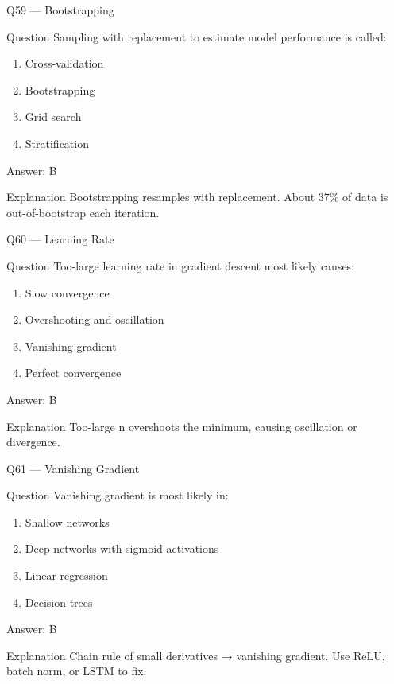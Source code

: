 \documentclass[aspectratio=169,8pt]{beamer}
\begin{document}
	\begin{frame}{Q59 --- Bootstrapping}
		\begin{block}{Question}
			Sampling with replacement to estimate model performance is called:
		\end{block}
		\begin{enumerate}
			\item Cross-validation
			\item Bootstrapping
			\item Grid search
			\item Stratification
		\end{enumerate}
		\begin{exampleblock}{Answer: B}\end{exampleblock}
		\begin{block}{Explanation}
			Bootstrapping resamples with replacement. About 37\% of data is out-of-bootstrap each iteration.
		\end{block}
	\end{frame}
	
	\begin{frame}{Q60 --- Learning Rate}
		\begin{block}{Question}
			Too-large learning rate in gradient descent most likely causes:
		\end{block}
		\begin{enumerate}
			\item Slow convergence
			\item Overshooting and oscillation
			\item Vanishing gradient
			\item Perfect convergence
		\end{enumerate}
		\begin{exampleblock}{Answer: B}\end{exampleblock}
		\begin{block}{Explanation}
			Too-large n overshoots the minimum, causing oscillation or divergence.
		\end{block}
	\end{frame}
	
	\begin{frame}{Q61 --- Vanishing Gradient}
		\begin{block}{Question}
			Vanishing gradient is most likely in:
		\end{block}
		\begin{enumerate}
			\item Shallow networks
			\item Deep networks with sigmoid activations
			\item Linear regression
			\item Decision trees
		\end{enumerate}
		\begin{exampleblock}{Answer: B}\end{exampleblock}
		\begin{block}{Explanation}
			Chain rule of small derivatives → vanishing gradient. Use ReLU, batch norm, or LSTM to fix.
		\end{block}
	\end{frame}
	
\end{document}
